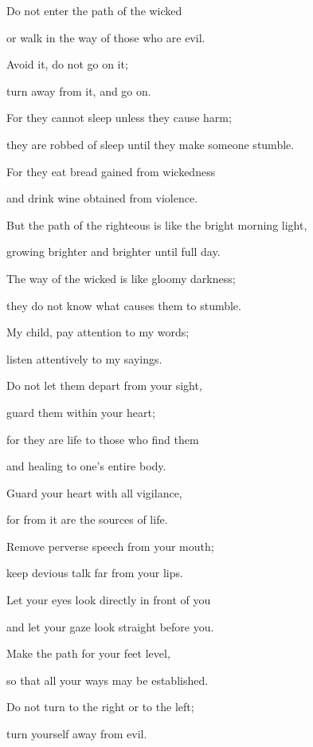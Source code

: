 {\par }{\Q {}Do not
enter
the path
of the wicked
\par }{\Q or
walk
in the way
of those who are evil.
\par }{\Q {}Avoid
it, do not
go on
it;
\par }{\Q turn away
from it, and go
on.
\par }{\Q {}For
they cannot
sleep
unless
they cause harm;
\par }{\Q they are robbed
of sleep
until they make someone
stumble.
\par }{\Q {}For
they eat
bread
gained from wickedness
\par }{\Q and drink
wine
obtained from violence.
\par }{\Q {}But the path
of the righteous
is like the bright
morning light,
\par }{\Q growing
brighter
and brighter until
full
day.
\par }{\Q {}The way
of the wicked
is like gloomy
darkness;

\par }{\Q they do not
know
what
causes them to stumble.
\par }{\Q {}My child,
pay attention
to my words;
\par }{\Q listen attentively
to my sayings.
\par }{\Q {}Do not
let them depart
from your sight,
\par }{\Q guard
them within
your heart;
\par }{\Q {}for
they are life
to those
who find
them
\par }{\Q and healing
to one’s entire
body.
\par }{\Q {}Guard
your heart
with all
vigilance,
\par }{\Q for
from
it are the sources
of life.
\par }{\Q {}Remove
perverse
speech from your mouth;
\par }{\Q keep devious
talk far
from
your lips.
\par }{\Q {}Let
your eyes
look directly
in front of you
\par }{\Q and let
your gaze
look straight
before you.
\par }{\Q {}Make
the path
for your feet
level,

\par }{\Q so that
all
your ways
may be established.
\par }{\Q {}Do not
turn
to the right
or to the left;
\par }{\Q turn
yourself
away from evil.


}
